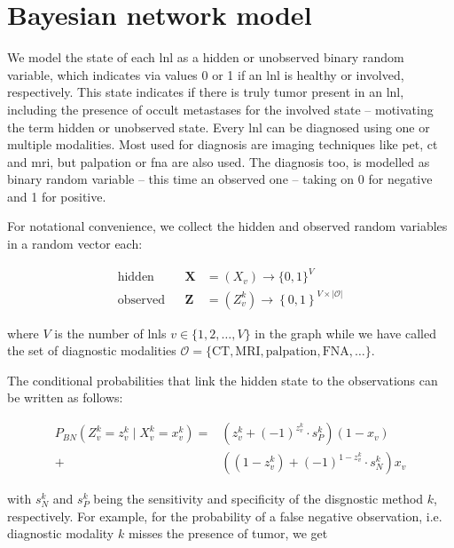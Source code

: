 \documentclass[../ms.tex]{subfiles}
\begin{document}
\chapter{Bayesian network model}
\label{chap:bn_model}

We model the state of each \gls{lnl} as a hidden or unobserved binary random variable, which indicates via values 0 or 1 if an \gls{lnl} is healthy or involved, respectively. This state indicates if there is truly tumor present in an \gls{lnl}, including the presence of occult metastases for the involved state – motivating the term hidden or unobserved state. Every \gls{lnl} can be diagnosed using one or multiple modalities. Most used for diagnosis are imaging techniques like \gls{pet}, \gls{ct} and \gls{mri}, but palpation or \gls{fna} are also used. The diagnosis too, is modelled as binary random variable – this time an observed one – taking on 0 for negative and 1 for positive.

For notational convenience, we collect the hidden and observed random variables in a random vector each:

\begin{equation}
    \begin{aligned}
        \text{hidden}& & \mathbf{X} &= ( X_v ) \rightarrow \{ 0,1 \}^V \\
        \text{observed}& & \mathbf{Z} &= ( Z_v^k ) \rightarrow \left\{ 0, 1 \right\}^{V \times |\mathcal{O}|}
    \end{aligned}
\end{equation}

where $V$ is the number of \glspl{lnl} $v \in \{ 1,2,\ldots,V \}$ in the graph while we have called the set of diagnostic modalities $\mathcal{O} = \{ \text{CT}, \text{MRI}, \text{palpation}, \text{FNA}, \ldots \}$.

The conditional probabilities that link the hidden state to the observations can be written as follows:

\begin{equation}
    \begin{aligned}
        P_{BN} \left( Z_v^k = z_v^k \mid X_v^k = x_v^k \right) = &\left( z_v^k + (-1)^{z_v^k} \cdot s_P^k \right)(1 - x_v) \\ 
        + &\left( (1 - z_v^k) + (-1)^{1 - z_v^k} \cdot s_N^k \right) x_v
    \end{aligned}
\end{equation}

with $s_N^k$ and $s_P^k$ being the sensitivity and specificity of the disgnostic method $k$, respectively. For example, for the probability of a false negative observation, i.e. diagnostic modality $k$ misses the presence of tumor, we get
\end{document}
